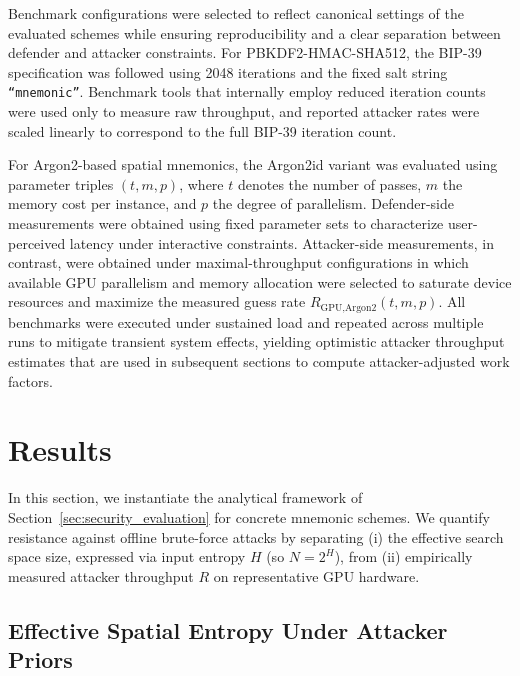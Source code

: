 \documentclass[mathematics,article,accept,pdftex,moreauthors]{Definitions/mdpi}
\begin{document}
Benchmark configurations were selected to reflect canonical settings of the evaluated schemes while ensuring reproducibility and a clear separation between defender and attacker constraints. For PBKDF2-HMAC-SHA512, the BIP-39 specification was followed using 2048
 iterations and the fixed salt string \texttt{``mnemonic''}. Benchmark tools that internally employ reduced iteration counts were used only to measure raw throughput, and reported attacker rates were scaled linearly to correspond to the full BIP-39 iteration count.

For Argon2-based spatial mnemonics, the Argon2id variant was evaluated using parameter triples $(t,m,p)$, where $t$ denotes the number of passes, $m$ the memory cost per instance, and $p$ the degree of parallelism. Defender-side measurements were obtained using fixed parameter sets to characterize user-perceived latency under interactive constraints. Attacker-side measurements, in contrast, were obtained under maximal-throughput configurations in which available GPU parallelism and memory allocation were selected to saturate device resources and maximize the measured guess rate $R_{\text{GPU,Argon2}}(t,m,p)$. All benchmarks were executed under sustained load and repeated across multiple runs to mitigate transient system effects, yielding optimistic attacker throughput estimates that are used in subsequent sections to compute attacker-adjusted work factors.





\section{Results\label{sec5}}
\label{sec:results}


In this section, we instantiate the analytical framework of Section~\ref{sec:security_evaluation} for concrete mnemonic schemes. We quantify resistance against offline brute-force attacks by separating (i) the effective search space size, expressed via input entropy $H$ (so $N = 2^{H}$), from (ii) empirically measured attacker throughput $R$ on representative GPU hardware.


\subsection{Effective Spatial Entropy Under Attacker Priors}
\label{sec:entropy_floors}
\end{document}
